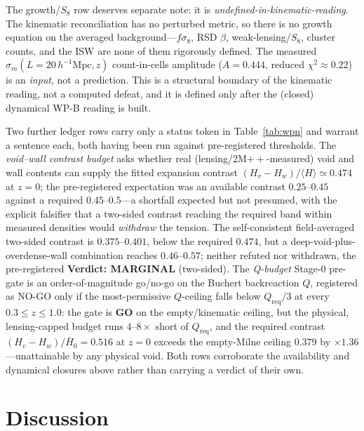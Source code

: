 \documentclass[aps,prd,twocolumn,nofootinbib,superscriptaddress,floatfix]{revtex4-2}
\newcommand{\Hbaro}{\bar H_{0}}
\newcommand{\hmpc}{\,h^{-1}\mathrm{Mpc}}
\begin{document}
The growth/$S_8$ row deserves separate note: it is
\emph{undefined-in-kinematic-reading}. The kinematic reconciliation has no
perturbed metric, so there is no growth equation on the averaged
background---$f\sigma_8$, RSD $\beta$, weak-lensing/$S_8$, cluster counts, and the
ISW are none of them rigorously defined. The measured
$\sigma_m(L=20\hmpc,z)$ count-in-cells amplitude ($A=0.444$, reduced
$\chi^2\approx0.22$) is an \emph{input}, not a prediction. This is a structural
boundary of the kinematic reading, not a computed defeat, and it is defined only
after the (closed) dynamical WP-B reading is built.

Two further ledger rows carry only a status token in Table~\ref{tab:wpn} and
warrant a sentence each, both having been run against pre-registered thresholds.
The \emph{void--wall contrast budget} asks whether real (lensing/2M$++$-measured)
void and wall contents can supply the fitted expansion contrast
$(H_v-H_w)/\langle H\rangle\simeq0.474$ at $z=0$; the pre-registered expectation was
an available contrast $0.25$--$0.45$ against a required $0.45$--$0.5$---a shortfall
expected but not presumed, with the explicit falsifier that a two-sided contrast
reaching the required band within measured densities would \emph{withdraw} the
tension. The self-consistent field-averaged two-sided contrast is $0.375$--$0.401$,
below the required $0.474$, but a deep-void-plus-overdense-wall combination reaches
$0.46$--$0.57$; neither refuted nor withdrawn, the pre-registered
\textbf{Verdict: MARGINAL} (two-sided). The \emph{Q-budget} Stage-0 pre-gate is an
order-of-magnitude go/no-go on the Buchert backreaction $Q$, registered as NO-GO
only if the most-permissive $Q$-ceiling falls below $Q_{\mathrm{req}}/3$ at every
$0.3\le z\le1.0$: the gate is \textbf{GO} on the empty/kinematic ceiling, but the
physical, lensing-capped budget runs $4$--$8\times$ short of $Q_{\mathrm{req}}$, and
the required contrast $(H_v-H_w)/\Hbaro=0.516$ at $z=0$ exceeds the empty-Milne
ceiling $0.379$ by $\times1.36$---unattainable by any physical void. Both rows
corroborate the availability and dynamical closures above rather than carrying a
verdict of their own.

\section{Discussion}
\label{sec:discussion}
\end{document}
